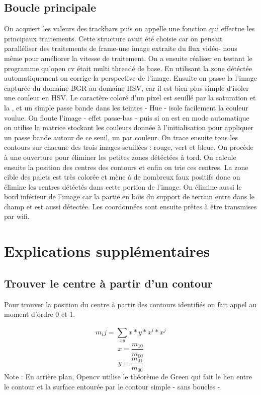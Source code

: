 \documentclass{article}
\begin{document}
	\subsection{Boucle principale}
		On acquiert les valeurs des trackbars puis on appelle une fonction qui effectue les principaux traitements. Cette structure avait été choisie car on pensait paralléliser des traitements de frame-une image extraite du flux vidéo- nous même pour améliorer la vitesse de traitement. On a ensuite réaliser en testant le programme qu'open cv était multi threadé de base.
		En utilisant la zone détéctée automatiquement on corrige la perspective de l'image. Ensuite on passe la l'image capturée du domaine BGR au domaine HSV, car il est bien plus simple d'isoler une couleur en HSV. Le caractère coloré d'un pixel est seuillé par la saturation et la , et un simple passe bande dans les teintes - Hue - isole facilement la couleur voulue. On floute l'image - effet passe-bas - puis si on est en mode automatique on utilise la matrice stockant les couleurs donnée à l'initialisation pour appliquer un passe bande autour de ce seuil, un par couleur. On trace ensuite tous les contours sur chacune des trois images seuillées : rouge, vert et bleue. On procède à une ouverture pour éliminer les petites zones détéctées à tord. On calcule ensuite la position des centres des contours et enfin on trie ces centres. La zone cible des palets est très colorée et mène à de nombreux faux positifs donc on élimine les centres détéctés dans cette portion de l'image. On élimine aussi le bord inférieur de l'image car la partie en bois du support de terrain entre dans le champ et est aussi détectée. Les coordonnées sont ensuite prêtes à être transmises par wifi.

\section{Explications supplémentaires}

\subsection{Trouver le centre à partir d'un contour}
	Pour trouver la position du centre à partir des contours identifiés on fait appel au moment d'ordre 0 et 1.

	\begin{equation*}
		m_ij = \sum_{xy}^{} x*y*x^{i}*x^{j}
	\end{equation*}
	\begin{equation*}
		x = \frac{m_{10}}{m_{00}}
	\end{equation*}
	\begin{equation*}
		y = \frac{m_{01}}{m_{00}}
	\end{equation*}
	Note : En arrière plan, Opencv utilise le théorème de Green qui fait le lien entre le contour et la surface entourée par le contour simple - sans boucles -.
\end{document}
